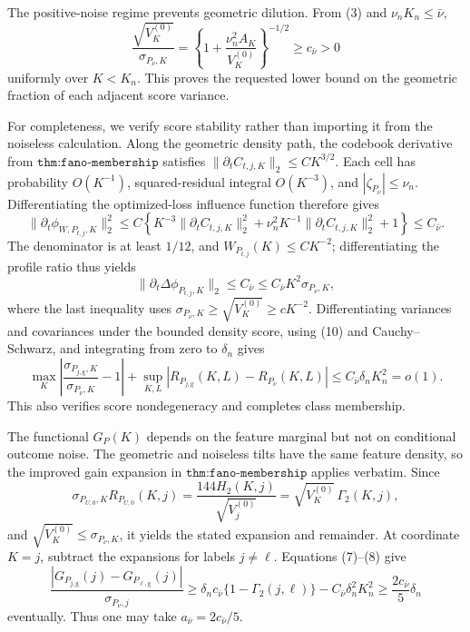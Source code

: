 The positive-noise regime prevents geometric dilution.  From (3) and \(\nu_nK_n\leq\bar\nu\),
\[
 \frac{\sqrt{V_K^{(0)}}}{\sigma_{P_\nu,K}}
 =\left\{1+\frac{\nu_n^2A_K}{V_K^{(0)}}\right\}^{-1/2}
 \geq c_{\bar\nu}>0                                                                    \tag{8}
\]
uniformly over \(K<K_n\).  This proves the requested lower bound on the geometric fraction of each adjacent score variance.

For completeness, we verify score stability rather than importing it from the noiseless calculation.  Along the geometric density path, the codebook derivative from \(\texttt{thm:fano-membership}\) satisfies \(\|\partial_tC_{t,j,K}\|_2\leq CK^{3/2}\).  Each cell has probability \(O(K^{-1})\), squared-residual integral \(O(K^{-3})\), and \(|\zeta_{P_\nu}|\leq\nu_n\).  Differentiating the optimized-loss influence function therefore gives
\[
 \|\partial_t\phi_{W,P_{t,j},K}\|_2^2
 \leq C\left\{K^{-3}\|\partial_tC_{t,j,K}\|_2^2
 +\nu_n^2K^{-1}\|\partial_tC_{t,j,K}\|_2^2+1\right\}
 \leq C_{\bar\nu}.                                                                      \tag{9}
\]
The denominator is at least \(1/12\), and \(W_{P_{t,j}}(K)\leq CK^{-2}\); differentiating the profile ratio thus yields
\[
 \|\partial_t\Delta\phi_{P_{t,j},K}\|_2
 \leq C_{\bar\nu}\leq C_{\bar\nu}K^2\sigma_{P_\nu,K},                              \tag{10}
\]
where the last inequality uses \(\sigma_{P_\nu,K}\geq\sqrt{V_K^{(0)}}\geq cK^{-2}\).  Differentiating variances and covariances under the bounded density score, using (10) and Cauchy--Schwarz, and integrating from zero to \(\delta_n\) gives
\[
 \max_K\left|\frac{\sigma_{P_{j,\mathrm g},K}}{\sigma_{P_\nu,K}}-1\right|
 +\sup_{K,L}|R_{P_{j,\mathrm g}}(K,L)-R_{P_\nu}(K,L)|
 \leq C_{\bar\nu}\delta_nK_n^2=o(1).                                                   \tag{11}
\]
This also verifies score nondegeneracy and completes class membership.

The functional \(G_P(K)\) depends on the feature marginal but not on conditional outcome noise.  The geometric and noiseless tilts have the same feature density, so the improved gain expansion in \(\texttt{thm:fano-membership}\) applies verbatim.  Since
\[
 \sigma_{P_{U,0},K}R_{P_{U,0}}(K,j)
 =\frac{144H_2(K,j)}{\sqrt{V_j^{(0)}}}
 =\sqrt{V_K^{(0)}}\,\Gamma_2(K,j),                                                       \tag{12}
\]
and \(\sqrt{V_K^{(0)}}\leq\sigma_{P_\nu,K}\), it yields the stated expansion and remainder.  At coordinate \(K=j\), subtract the expansions for labels \(j\ne\ell\).  Equations (7)--(8) give
\[
 \frac{|G_{P_{j,\mathrm g}}(j)-G_{P_{\ell,\mathrm g}}(j)|}{\sigma_{P_\nu,j}}
 \geq\delta_n c_{\bar\nu}\{1-\Gamma_2(j,\ell)\}
 -C_{\bar\nu}\delta_n^2K_n^2
 \geq\frac{2c_{\bar\nu}}5\delta_n                                                     \tag{13}
\]
eventually.  Thus one may take \(a_{\bar\nu}=2c_{\bar\nu}/5\).

